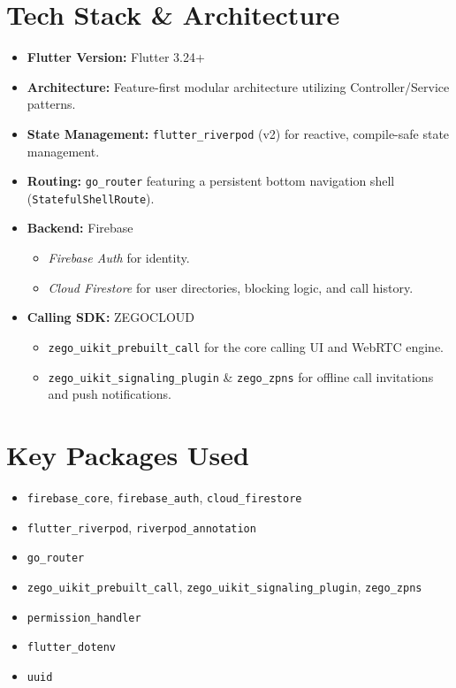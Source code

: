 \documentclass[11pt,a4paper]{article}
\begin{document}
\section*{Tech Stack \& Architecture}
\begin{itemize}
    \item \textbf{Flutter Version:} Flutter 3.24+
    \item \textbf{Architecture:} Feature-first modular architecture utilizing Controller/Service patterns.
    \item \textbf{State Management:} \texttt{flutter\_riverpod} (v2) for reactive, compile-safe state management.
    \item \textbf{Routing:} \texttt{go\_router} featuring a persistent bottom navigation shell (\texttt{StatefulShellRoute}).
    \item \textbf{Backend:} Firebase 
    \begin{itemize}
        \item \textit{Firebase Auth} for identity.
        \item \textit{Cloud Firestore} for user directories, blocking logic, and call history.
    \end{itemize}
    \item \textbf{Calling SDK:} ZEGOCLOUD
    \begin{itemize}
        \item \texttt{zego\_uikit\_prebuilt\_call} for the core calling UI and WebRTC engine.
        \item \texttt{zego\_uikit\_signaling\_plugin} \& \texttt{zego\_zpns} for offline call invitations and push notifications.
    \end{itemize}
\end{itemize}

\section*{Key Packages Used}
\begin{itemize}
    \item \texttt{firebase\_core}, \texttt{firebase\_auth}, \texttt{cloud\_firestore}
    \item \texttt{flutter\_riverpod}, \texttt{riverpod\_annotation}
    \item \texttt{go\_router}
    \item \texttt{zego\_uikit\_prebuilt\_call}, \texttt{zego\_uikit\_signaling\_plugin}, \texttt{zego\_zpns}
    \item \texttt{permission\_handler}
    \item \texttt{flutter\_dotenv}
    \item \texttt{uuid}
\end{itemize}
\end{document}
